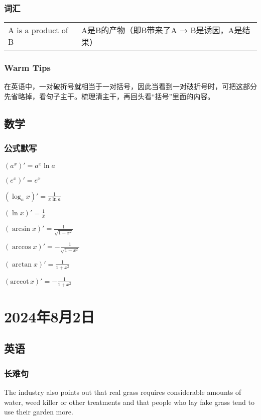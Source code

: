 \documentclass[UTF8]{ctexart}
\newcommand{\arccot}{\mathrm{arccot}\,}
\begin{document}
\subsubsection{词汇}
\begin{table}[h]
      \centering
      \begin{tabular}{p{}p{}}
            A is a product of B & A是B的产物（即B带来了A → B是诱因，A是结果）
      \end{tabular}
\end{table}

\subsubsection{Warm Tips}
在英语中，一对破折号就相当于一对括号，因此当看到一对破折号时，可把这部分先省略掉，看句子主干。梳理清主干，再回头看“括号”里面的内容。
\subsection{数学}
\subsubsection{公式默写}
\begin{multicols}{3}
      $(a^x)'=a^x\ln a$

      $(e^x)'=e^x$

      $(\log_a x)'=\frac{1}{x\ln a}$

      $(\ln x)'=\frac{1}{x}$

      $(\arcsin x)'=\frac{1}{\sqrt{1-x^2}}$

      $(\arccos x)'=-\frac{1}{\sqrt{1-x^2}}$

      $(\arctan x)'=\frac{1}{1+x^2}$

      $(\arccot x)'=-\frac{1}{1+x^2}$
\end{multicols}
\section{2024年8月2日}
\subsection{英语}
\subsubsection{长难句}
The industry also points out that real grass requires considerable amounts of water, weed killer or other treatments and that people who lay fake grass tend to use their garden more.
\end{document}
